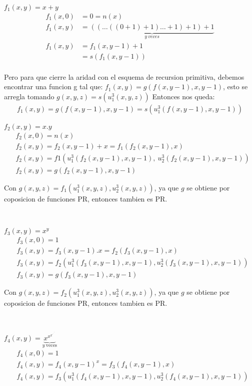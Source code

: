 \documentclass{report}
\begin{document}
\sol $f_1(x,y) = x+y$
\begin{align*}
	f_1(x,0) & = 0 = n(x)                                                 \\
	f_1(x,y) & = \underbrace{((\ldots((0+1)+1)\ldots+1)+1)+1}_{y \ veces} \\
	f_1(x,y) & = f_1(x,y-1)+1                                             \\
	         & = s(f_1(x,y-1))                                            \\
\end{align*}

Pero para que cierre la aridad con el esquema de recursion primitiva, debemos encontrar una funcion g tal que:
$f_1(x,y) = g(f(x,y-1),x,y-1)$, esto se arregla tomando $g(x,y,z) = s(u_1^3(x,y,z))$
Entonces nos queda:
\begin{align}
	f_1(x,y) = g(f(x,y-1),x,y-1) = s(u_1^3(f(x,y-1),x,y-1))
\end{align}

\sol $f_{2}(x,y)=x.y$
\begin{align*}
	 & f_{2}(x,0)=n(x)                                                   \\
	 & f_2(x,y)=f_2(x,y-1)+x=f_1(f_2(x,y-1),x)                           \\
	 & f_{2}(x,y)= f1(u_1^3(f_2(x,y-1),x,y-1),\ u_2^3(f_2(x,y-1),x,y-1)) \\
	 & f_{2}(x,y)= g(f_2(x,y-1),x,y-1)
\end{align*}

Con $g(x,y,z) = f_1(u_1^3(x,y,z),u_2^3(x,y,z))$, ya que $g$ se obtiene por coposicion de funciones PR, entonces tambien es PR.

~

\sol $f_{3}(x,y)=x^{y}$
\begin{align*}
	 & f_{3}(x,0)=1                                                                  \\
	 & f_{3}(x,y)=f_{3}(x,y-1).x=f_{2}(f_{3}(x,y-1),x)                               \\
	 & f_{3}(x,y)=f_{2}(u_{1}^{3}(f_{3}(x,y-1),x,y-1),u_{2}^{3}(f_{3}(x,y-1),x,y-1)) \\
	 & f_{3}(x,y)= g(f_3(x,y-1),x,y-1)
\end{align*}

Con $g(x,y,z) = f_2(u_1^3(x,y,z),u_2^3(x,y,z))$, ya que $g$ se obtiene por coposicion de funciones PR, entonces tambien es PR.

~

\sol
$f_4(x,y)=\underbrace{x^{x^{x^{\cdot^{\cdot^{\cdot^{\cdot^{x}}}}}}}}_{y\ \text{veces}}$
\begin{align*}
	 & f_{4}(x,0)=1                                                                  \\
	 & f_{4}(x,y)=f_{4}(x,y-1)^{x}=f_{3}(f_{4}(x,y-1),x)                             \\
	 & f_{4}(x,y)=f_{3}(u_{1}^{3}(f_{4}(x,y-1),x,y-1),u_{2}^{3}(f_{4}(x,y-1),x,y-1))
\end{align*}
\end{document}
